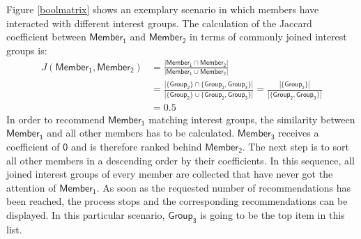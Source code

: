 \documentclass[12pt,numbers=noenddot,parskip,bibliography=totocnumbered,listof=totocnumbered,draft]{scrreprt}
\begin{document}
Figure \ref{boolmatrix} shows an exemplary scenario in which members have interacted with different interest groups. The calculation of the Jaccard coefficient between $\mathsf{Member_1}$ and $\mathsf{Member_2}$ in terms of commonly joined interest groups is:
\begin{align*}
J(\mathsf{Member_1}, \mathsf{Member_2}) &= \frac{|\mathsf{Member_1} \cap \mathsf{Member_2}|}{|\mathsf{Member_1} \cup \mathsf{Member_2}|} \\ &= \frac{|\{\mathsf{Group_2}\} \cap \{\mathsf{Group_2, Group_3}\}|}{|\{\mathsf{Group_2}\} \cup \{\mathsf{Group_2, Group_3}\}|} = \frac{|\{\mathsf{Group_2}\}|}{|\{\mathsf{Group_2, Group_3}\}|} \\ &= 0.5
\end{align*}
In order to recommend $\mathsf{Member_1}$ matching interest groups, the similarity between $\mathsf{Member_1}$ and all other members has to be calculated. $\mathsf{Member_3}$ receives a coefficient of $\mathsf{0}$ and is therefore ranked behind $\mathsf{Member_2}$. The next step is to sort all other members in a descending order by their coefficients. In this sequence, all joined interest groups of every member are collected that have never got the attention of $\mathsf{Member_1}$. As soon as the requested number of recommendations has been reached, the process stops and the corresponding recommendations can be displayed. In this particular scenario, $\mathsf{Group_3}$ is going to be the top item in this list.
\end{document}
